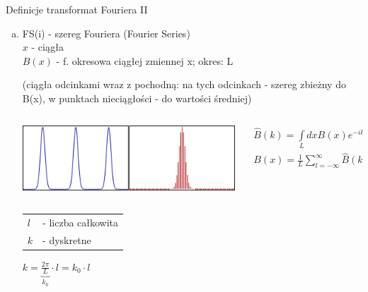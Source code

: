 \begin{frame}{Definicje transformat Fouriera II}
	\begin{enumerate}[b)]
		\item FS(i) - szereg Fouriera (Fourier Series) \\
		$x$ - ciągła \\
		$B(x)$ - f. okresowa ciągłej zmiennej x; okres: L
		\begin{center}
			(ciągła odcinkami wraz z pochodną: na tych odcinkach - szereg zbieżny do B(x), w punktach nieciągłości - do wartości średniej)
		\end{center}
        \begin{columns}
            \begin{column}{0.35\textwidth}
                \includegraphics[width=\textwidth]{img/16/fs_wykres1.png}
            \end{column}
            \begin{column}{0.65\textwidth}
                \begin{block}
                    \centering
                    \renewcommand{\arraystretch}{1.5}
                    \setlength{\abovedisplayskip}{0pt}
                    \setlength{\belowdisplayskip}{0pt}
                    \setlength{\abovedisplayshortskip}{0pt}
                    \setlength{\belowdisplayshortskip}{0pt}
                    \[
                        \begin{array}{c}
                            \widehat{B}(k) = \int\limits_{L}dx B(x) e^{-ikx} \\
                            B(x) = \frac{1}{L}\sum\limits_{l = -\infty}^{\infty} \widehat{B}(k) e^{ikx}
                        \end{array}
                        \tag{16.2}
                    \]
                \end{block}
            \end{column}
        \end{columns}
		\begin{tabular}{ll}
			$l$ & - liczba całkowita \\
			$k$ & - dyskretne
		\end{tabular}
		\hfill $k = \underbrace{\frac{2 \pi}{L}}_{k_0} \cdot l = k_0 \cdot l$
	\end{enumerate}
\end{frame}
